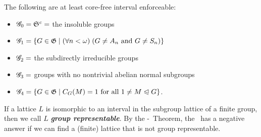 \documentclass[xcolor=dvipsnames,11pt,hide notes]{beamer}
\newcommand{\defn}[1]{\textcolor{olivegreen}{\textit{\textbf{#1}}}}
\theoremstyle{definition}
\theoremstyle{remark}
\numberwithin{theorem}{section}
\numberwithin{claim}{section}
\numberwithin{equation}{section}
\numberwithin{conjecture}{section}
\begin{document}
\begin{frame}[label=IEProps]{}
The following are at least core-free interval enforceable:
\vskip5mm
\begin{itemize}
\item $\mathscr{G}_0 = \mathfrak{S}^c = $ the insoluble groups
\vskip2mm
\item $\mathscr{G}_1 =\{G\in \mathfrak{G} \mid (\forall n<\omega) \; (G \neq A_n \text{ and }  G\neq S_n) \}$
\vskip2mm
\item $\mathscr{G}_2 = $ the subdirectly irreducible groups
\vskip2mm
\item $\mathscr{G}_3 = $ groups with no nontrivial abelian normal subgroups
\vskip2mm
\item $\mathscr{G}_4 = \{G\in \mathfrak{G} \mid C_G(M) = 1 \text{ for all } 1\neq M\trianglelefteqslant G\}$.
\end{itemize}
\vskip5mm
\end{frame}

\begin{frame}[label=IEProps]{}
\vskip2mm
If a lattice $L$ is isomorphic to an interval in the subgroup lattice of a finite group, then we call
$L$ \defn{group representable}.  
\vskip5mm
By the \Palfy-\Pudlak\ Theorem, the
\FLRP\ has a negative answer if we can find a (finite) lattice that is not group
representable.  
\vskip5mm
\end{frame}
\end{document}
